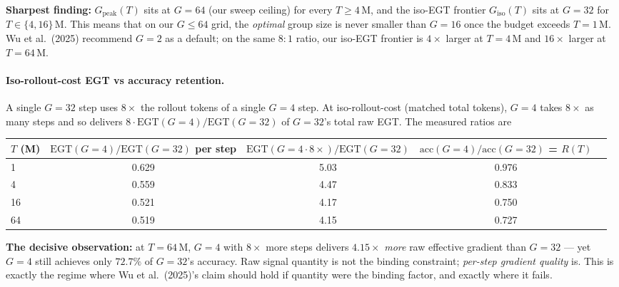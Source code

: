 \noindent
\textbf{Sharpest finding:} $G_{\mathrm{peak}}(T)$ sits at $G{=}64$
(our sweep ceiling) for every $T \ge 4\,\mathrm{M}$, and the iso-EGT
frontier $G_{\mathrm{iso}}(T)$ sits at $G{=}32$ for $T \in \{4, 16\}\,\mathrm{M}$.
This means that on our $G \le 64$ grid, the \emph{optimal} group size is
never smaller than $G{=}16$ once the budget exceeds $T{=}1\,\mathrm{M}$.
Wu et al.\ (2025) recommend $G{=}2$ as a default; on the same $8{:}1$
ratio, our iso-EGT frontier is $4{\times}$ larger at $T{=}4\,\mathrm{M}$
and $16{\times}$ larger at $T{=}64\,\mathrm{M}$.

\paragraph{Iso-rollout-cost EGT vs accuracy retention.}
A single $G{=}32$ step uses $8{\times}$ the rollout tokens of a single
$G{=}4$ step.  At iso-rollout-cost (matched total tokens), $G{=}4$
takes $8{\times}$ as many steps and so delivers
$8 \cdot \mathrm{EGT}(G{=}4) / \mathrm{EGT}(G{=}32)$ of $G{=}32$'s
total raw EGT.  The measured ratios are

\begin{center}
\small
\begin{tabular}{lcccc}
\toprule
$T$ (M) & $\mathrm{EGT}(G{=}4)/\mathrm{EGT}(G{=}32)$ per step
        & $\mathrm{EGT}(G{=}4 \cdot 8\!\times) / \mathrm{EGT}(G{=}32)$
        & $\mathrm{acc}(G{=}4)/\mathrm{acc}(G{=}32)$ = $R(T)$ \\
\midrule
  1 & 0.629 & 5.03 & 0.976 \\
  4 & 0.559 & 4.47 & 0.833 \\
 16 & 0.521 & 4.17 & 0.750 \\
 64 & 0.519 & 4.15 & 0.727 \\
\bottomrule
\end{tabular}
\end{center}

\noindent
\textbf{The decisive observation:} at $T{=}64\,\mathrm{M}$, $G{=}4$ with
$8{\times}$ more steps delivers $4.15{\times}$ \emph{more} raw
effective gradient than $G{=}32$ --- yet $G{=}4$ still achieves only
$72.7\%$ of $G{=}32$'s accuracy.  Raw signal quantity is not the
binding constraint; \emph{per-step gradient quality} is.  This is
exactly the regime where Wu et al.\ (2025)'s claim should hold if
quantity were the binding factor, and exactly where it fails.

